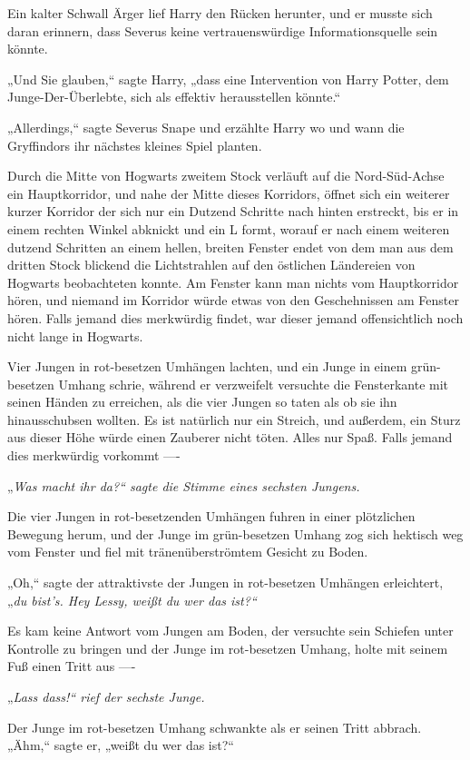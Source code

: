 {Ein kalter Schwall Ärger lief Harry den Rücken herunter, und er musste sich daran erinnern, dass Severus keine vertrauenswürdige Informationsquelle sein könnte.

„Und Sie glauben,“ sagte Harry, „dass eine Intervention von Harry Potter, dem Junge-Der-Überlebte, sich als effektiv herausstellen könnte.“

„Allerdings,“ sagte Severus Snape und erzählte Harry wo und wann die Gryffindors ihr nächstes kleines Spiel planten.

Durch die Mitte von Hogwarts zweitem Stock verläuft auf die Nord-Süd-Achse ein Hauptkorridor, und nahe der Mitte dieses Korridors, öffnet sich ein weiterer kurzer Korridor der sich nur ein Dutzend Schritte nach hinten erstreckt, bis er in einem rechten Winkel abknickt und ein L formt, worauf er nach einem weiteren dutzend Schritten an einem hellen, breiten Fenster endet von dem man aus dem dritten Stock blickend die Lichtstrahlen auf den östlichen Ländereien von Hogwarts beobachteten konnte. Am Fenster kann man nichts vom Hauptkorridor hören, und niemand im Korridor würde etwas von den Geschehnissen am Fenster hören. Falls jemand dies merkwürdig findet, war dieser jemand offensichtlich noch nicht lange in Hogwarts.

Vier Jungen in rot-besetzen Umhängen lachten, und ein Junge in einem grün-besetzen Umhang schrie, während er verzweifelt versuchte die Fensterkante mit seinen Händen zu erreichen, als die vier Jungen so taten als ob sie ihn hinausschubsen wollten. Es ist natürlich nur ein Streich, und außerdem, ein Sturz aus dieser Höhe würde einen Zauberer nicht töten. Alles nur Spaß. Falls jemand dies merkwürdig vorkommt ----

„\emph{Was macht ihr da?“ sagte die Stimme eines sechsten Jungens.}

Die vier Jungen in rot-besetzenden Umhängen fuhren in einer plötzlichen Bewegung herum, und der Junge im grün-besetzen Umhang zog sich hektisch weg vom Fenster und fiel mit tränenüberströmtem Gesicht zu Boden.

„Oh,“ sagte der attraktivste der Jungen in rot-besetzen Umhängen erleichtert, „\emph{du bist's. Hey Lessy, weißt du wer das ist?“}

Es kam keine Antwort vom Jungen am Boden, der versuchte sein Schiefen unter Kontrolle zu bringen und der Junge im rot-besetzen Umhang, holte mit seinem Fuß einen Tritt aus ----

„\emph{Lass dass!“ rief der sechste Junge.}

Der Junge im rot-besetzen Umhang schwankte als er seinen Tritt abbrach. „Ähm,“ sagte er, „weißt du wer das ist?“

}
